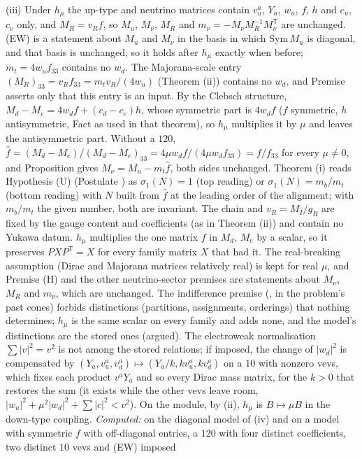 (iii) Under $h_{\mu}$ the up-type and neutrino matrices contain $v_{u}^{a}$, $Y_{a}$, $w_{u}$, $f$, $h$ and $c_{u}$, $c_{\nu}$ only, and $M_{R} = v_{R}f$, so $M_{u}$, $M_{\nu}$, $M_{R}$ and $m_{\nu} = -M_{\nu}M_{R}^{-1}M_{\nu}^{\mathsf{T}}$ are unchanged. (EW) is a statement about $M_{u}$ and $M_{\nu}$ in the basis in which $\mathrm{Sym}\,M_{u}$ is diagonal, and that basis is unchanged, so it holds after $h_{\mu}$ exactly when before; $m_{t} = 4w_{u}f_{33}$ contains no $w_{d}$. The Majorana-scale entry $(M_{R})_{33} = v_{R}f_{33} = m_{t}v_{R}/(4w_{u})$ (Theorem (ii)) contains no $w_{d}$, and Premise  asserts only that this entry is an input. By the Clebsch structure, $M_{d} - M_{e} = 4w_{d}f + (c_{d} - c_{e})h$, whose symmetric part is $4w_{d}f$ ($f$ symmetric, $h$ antisymmetric, Fact  as used in that theorem), so $h_{\mu}$ multiplies it by $\mu$ and leaves the antisymmetric part. Without a $120$, $\hat{f} = (M_{d} - M_{e})/(M_{d} - M_{e})_{33} = 4\mu w_{d}f/(4\mu w_{d}f_{33}) = f/f_{33}$ for every $\mu \ne 0$, and Proposition  gives $M_{\nu} = M_{u} - m_{t}\hat{f}$, both sides unchanged. Theorem (i) reads Hypothesis (U) (Postulate ) as $\sigma_{1}(N) = 1$ (top reading) or $\sigma_{1}(N) = m_{b}/m_{t}$ (bottom reading) with $N$ built from $\hat{f}$ at the leading order of the alignment; with $m_{b}/m_{t}$ the given number, both are invariant. The chain and $v_{R} = M_{I}/g_{R}$ are fixed by the gauge content and coefficients (as in Theorem (ii)) and contain no Yukawa datum. $h_{\mu}$ multiplies the one matrix $f$ in $M_{d}$, $M_{e}$ by a scalar, so it preserves $PXP^{\mathsf{T}} = X$ for every family matrix $X$ that had it. The real-breaking assumption (Dirac and Majorana matrices relatively real) is kept for real $\mu$, and Premise (H) and the other neutrino-sector premises are statements about $M_{\nu}$, $M_{R}$ and $m_{\nu}$, which are unchanged. The indifference premise (, in the problem's past cones) forbids distinctions (partitions, assignments, orderings) that nothing determines; $h_{\mu}$ is the same scalar on every family and adds none, and the model's distinctions are the stored ones (argued). The electroweak normalisation $\sum|v|^{2} = v^{2}$ is not among the stored relations; if imposed, the change of $|w_{d}|^{2}$ is compensated by $(Y_{a}, v_{u}^{a}, v_{d}^{a}) \mapsto (Y_{a}/k, kv_{u}^{a}, kv_{d}^{a})$ on a $10$ with nonzero vevs, which fixes each product $v^{a}Y_{a}$ and so every Dirac mass matrix, for the $k > 0$ that restores the sum (it exists while the other vevs leave room, $|w_{u}|^{2} + \mu^{2}|w_{d}|^{2} + \sum|c|^{2} < v^{2}$). On the module, by (ii), $h_{\mu}$ is $B \mapsto \mu B$ in the down-type coupling. \emph{Computed:} on the diagonal model of (iv) and on a model with symmetric $f$ with off-diagonal entries, a $120$ with four distinct coefficients, two distinct $10$ vevs and (EW) imposed 